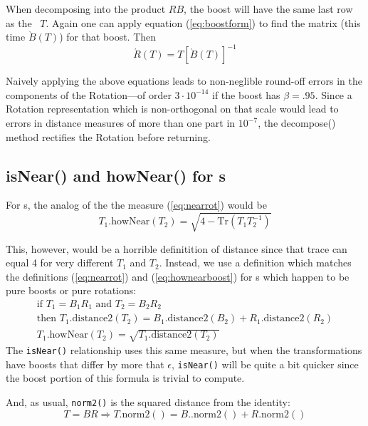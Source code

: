 When decomposing into the product $ R B $, the boost
will have the same last row as the \LT\ $T$.  Again
one can apply equation (\ref{eq:boostform}) to
find the matrix (this time $\grave{B}(T)$) for that boost.  Then
\begin{equation}
\label{eq:decomRB}
  \acute{R}(T) = T \left[ \grave{B}(T) \right] ^{-1}
\end{equation}

Naively applying the above equations leads to non-neglible round-off errors 
in the components of the Rotation---of order $3 \cdot 10^{-14}$ if the
boost has $\beta = .95$.
Since a Rotation representation which is non-orthogonal on that scale would 
lead to errors in distance measures of more than one part in $10^{-7}$,
the decompose() method rectifies the Rotation before returning.

\subsection{isNear() and howNear() for \protect\LT s}

For \LT s, the analog of the the \Rotation measure (\ref{eq:nearrot}) would be
\[
  T_1 \mbox{.howNear}(T_2) = \sqrt{ 4 - \mbox{Tr}(T_1 T_2^{-1}) }
\]

This, however, would be a horrible definitition of distance since that trace
can equal 4 for very different $T_1$ and $T_2$.  Instead, we use a definition
which matches the definitions (\ref{eq:nearrot}) and (\ref{eq:hownearboost})
for \LT s which happen to be pure boosts or pure rotations:
\begin{eqnarray}
\label{eq:isnearLT}
\mbox{if } T_1 = B_1 R_1 \mbox{ and } T_2 = B_2 R_2 \nonumber \\
\mbox{then } T_1\mbox{.distance2}(T_2) = 
	B_1\mbox{.distance2}(B_2) + R_1\mbox{.distance2}(R_2)
	\\
\nonumber
T_1\mbox{.howNear}(T_2) = \sqrt {T_1\mbox{.distance2}(T_2)}
\end{eqnarray}
\noindent
The {\tt isNear()} relationship uses this same measure, but when the
transformations have boosts that differ by more that $\epsilon$, {\tt isNear()}
will be quite a bit quicker since the boost portion of this formula is trivial
to compute.

And, as usual, {\tt norm2()} is the squared distance from the identity:
\begin{equation}
\label{eq:ltnorm2}
T = B R \Longrightarrow T\mbox{.norm2}() = 
	B.\mbox{.norm2}() + R\mbox{.norm2}()
\end{equation}

